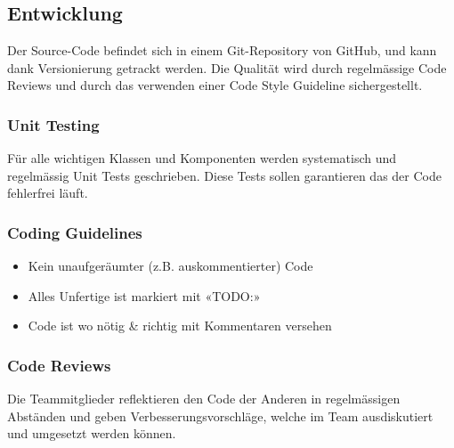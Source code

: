 \subsection{Entwicklung}
Der Source-Code befindet sich in einem Git-Repository von GitHub, und kann dank Versionierung getrackt werden. Die Qualität wird durch regelmässige Code Reviews und durch das verwenden einer Code Style
Guideline sichergestellt.

\subsubsection{Unit Testing}
Für alle wichtigen Klassen und Komponenten werden systematisch und regelmässig Unit Tests geschrieben. Diese Tests sollen garantieren das der Code fehlerfrei läuft.

\subsubsection{Coding Guidelines}
\begin{itemize}
    \item Kein unaufgeräumter (z.B. auskommentierter) Code
    \item Alles Unfertige ist markiert mit «TODO:»
    \item Code ist wo nötig \& richtig mit Kommentaren versehen
\end{itemize}

\subsubsection{Code Reviews}
Die Teammitglieder reflektieren den Code der Anderen in regelmässigen Abständen und geben Verbesserungsvorschläge, welche im Team ausdiskutiert und umgesetzt werden können.